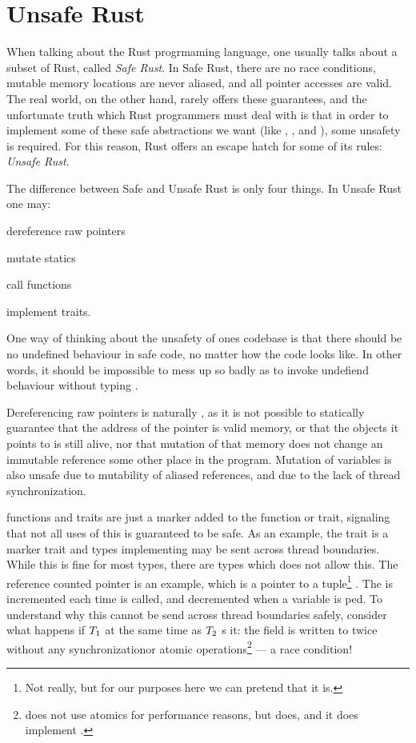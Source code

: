 \section{Unsafe Rust\label{sec:unsafe-rust}}

When talking about the Rust progrmaming language, one usually talks about a subset of Rust, called
\emph{Safe Rust}. In Safe Rust, there are no race conditions, mutable memory locations are never
aliased, and all pointer accesses are valid.  The real world, on the other hand, rarely offers
these guarantees, and the unfortunate truth which Rust programmers must deal with is that in order
to implement some of these safe abstractions we want (like , , and
), some unsafety is required.  For this reason, Rust offers an escape hatch for some of
its rules: \emph{Unsafe Rust}.

The difference between Safe and Unsafe Rust is only four things. In Unsafe Rust one may:
\begin{enumerate*}[1) ]
    \item dereference raw pointers
    \item mutate statics
    \item call  functions
    \item implement  traits.
\end{enumerate*}
One way of thinking about the unsafety of ones codebase is that there should be no undefined
behaviour in safe code, no matter how the code looks like. In other words, it should be impossible
to mess up so badly as to invoke undefiend behaviour without typing .

Dereferencing raw pointers is naturally , as it is not possible to statically
guarantee that the address of the pointer is valid memory, or that the objects it points to is
still alive, nor that mutation of that memory does not change an immutable reference some other
place in the program. Mutation of  variables is also unsafe due to mutability of
aliased references, and due to the lack of thread synchronization.

 functions and traits are just a marker added to the function or trait, signaling that
not all uses of this is guaranteed to be safe. As an example, the trait  is a marker
trait and types implementing  may be sent across thread boundaries. While this is fine
for most types, there are types which does not allow this. The reference counted pointer
 is an example, which is a pointer to a tuple\footnote{Not really, but for our purposes
here we can pretend that it is.} . The  is incremented each time
 is called, and decremented when a variable is ped.  To understand why
this cannot be send across thread boundaries safely, consider what happens if $T\sb{1}$
 at the same time as $T\sb{2}$ s it: the  field is written to
twice without any synchronizationor atomic operations\footnote{ does not use atomics for
performance reasons, but  does, and it does implement .} --- a race condition!

